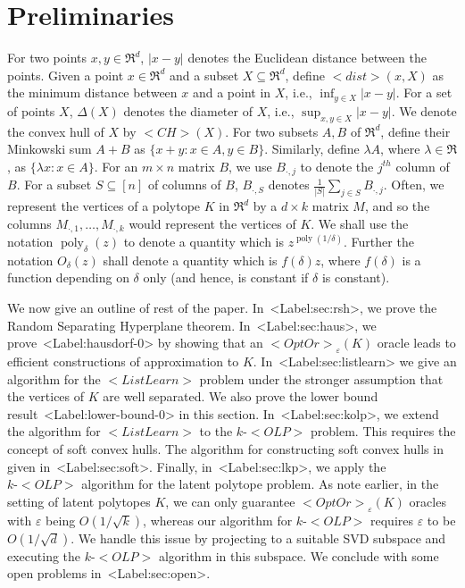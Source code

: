 \documentclass[11pt,letterpaper]{article}
\newcounter{note}[section]
\def\mathsf#1{<#1>}%
\def\xspace{}%
\def\Cref#1{<Label:#1>}%
\theoremstyle{definition}
\theoremstyle{remark}
\newcommand{\poly}{\operatorname{poly}}
\newcommand{\dist}{{\mathsf{dist}}}
\newcommand{\ch}{{\mathsf{CH}}}
\newcommand{\dia}{\Delta}
\newcommand{\olp}{{\mathsf {OLP}}\xspace}
\newcommand{\kolp}{k\mbox{-}\olp}
\newcommand{\ListLearn}{\mathsf {ListLearn}\xspace}
\newcommand{\Mdot}[1]{{M_{\cdot, #1}}}
\newcommand{\opto}{{\mathsf{OptOr}}}
\begin{document}
\section{Preliminaries}
 For two points $x, y \in \Re^d$, $|x-y|$ denotes the Euclidean distance between the points. Given a point $x \in \Re^d$ and a subset $X \subseteq \Re^d$, define $\dist(x, X)$ as the minimum distance between $x$ and a point in $X$, i.e., $\inf_{y \in X} |x-y|$. 
For a set of points $X$, $\dia(X)$ denotes the diameter of $X$, i.e., $\sup_{x, y \in X} |x-y|$. We  denote the convex hull of $X$ by $\ch(X)$. For two subsets $A, B$ of $\Re^d$, define their Minkowski sum $A+B$ as $\{x+y: x \in A, y \in B\}$. Similarly, define $\lambda A$, where $\lambda \in \Re$, as $\{ \lambda x: x \in A\}$.
For an $m \times n$ matrix $B$, we use $B_{\cdot, j}$ to denote the $j^{th}$ column of $B$. For a subset $S \subseteq [n]$ of columns of $B$, $B_{\cdot, S}$  denotes $\frac{1}{|S|} \sum_{j \in S} B_{\cdot, j}$. Often, we represent the vertices of a polytope $K$ in $\Re^d$ by a $d \times k$ matrix $M$, and so the columns $\Mdot{1}, \ldots, \Mdot{k}$ would represent the vertices of $K$. We shall use the notation $\poly_\delta(z)$ to denote a quantity which is $z^{\poly(1/\delta)}$. Further the notation $O_\delta(z)$ shall denote a quantity which is $f(\delta) z$, where $f(\delta)$ is a function depending on $\delta$ only (and hence, is constant if $\delta$ is constant). 

We now give an outline of rest of the paper. In~\Cref{sec:rsh}, we prove the Random Separating Hyperplane theorem.  In~\Cref{sec:haus}, we prove~\Cref{hausdorf-0} by showing that an $\opto_\varepsilon(K)$ oracle leads to efficient constructions of approximation to $K$. In~\Cref{sec:listlearn} we give an algorithm for the $\ListLearn$ problem under the stronger assumption that the vertices of $K$ are well separated. We also prove the lower bound result~\Cref{lower-bound-0} in this section. In~\Cref{sec:kolp}, we extend the algorithm for $\ListLearn$ to the $\kolp$ problem. This requires the concept of soft convex hulls. The algorithm for constructing soft convex hulls in given in~\Cref{sec:soft}. Finally, in~\Cref{sec:lkp}, we apply the $\kolp$ algorithm for the latent polytope problem. As note earlier, in the setting of latent polytopes $K$, we can only guarantee $\opto_\varepsilon(K)$ oracles with $\varepsilon$ being $O(1/\sqrt{k})$, whereas our algorithm for $\kolp$ requires $\varepsilon$ to be $O(1/\sqrt{d})$. We handle this issue by projecting to a suitable SVD subspace and executing the $\kolp$ algorithm in this subspace. We conclude with some open problems in~\Cref{sec:open}.
\end{document}
